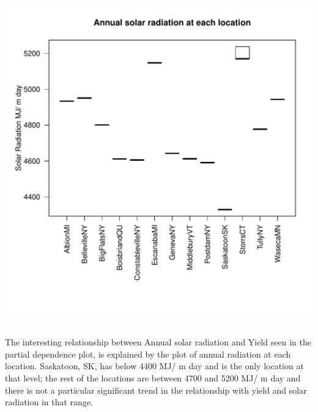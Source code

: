 \documentclass{article}\usepackage[]{graphicx}\usepackage[]{color}
\makeatletter
\def\maxwidth{ %
  \ifdim\Gin@nat@width>\linewidth
    \linewidth
  \else
    \Gin@nat@width
  \fi
}
\newenvironment{knitrout}{}{} %
\makeatother
\begin{document}
\begin{knitrout}
{}




{\centering \includegraphics[width=\maxwidth]{figure/OtherPartialDependence-5} 

}



\end{knitrout}
\\

The interesting relationship between Annual solar radiation and Yield seen in the partial dependence plot, is explained by the plot of annual radiation at each location. Saskatoon, SK, has below 4400 MJ/ m day and is the only location at that level; the rest of the locations are between 4700 and 5200 MJ/ m day and there is not a particular significant trend in the relationship with yield and solar radiation in that range. 


\\
\end{document}
